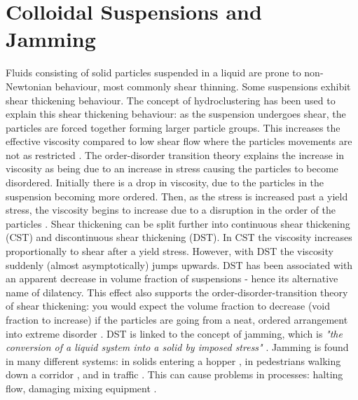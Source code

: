 \documentclass[twoside,a4]{report}
\def\br{\newline \newline \noindent}
\begin{document}
	\section*{Colloidal Suspensions and Jamming} %
	Fluids consisting of solid particles suspended in a liquid are prone to non-Newtonian behaviour, most commonly shear thinning. Some suspensions exhibit shear thickening behaviour. The concept of hydroclustering has been used to explain this shear thickening behaviour: as the suspension undergoes shear, the particles are forced together forming larger particle groups. This increases the effective viscosity compared to low shear flow where the particles movements are not as restricted \cite{figshearthick}. The order-disorder transition  theory explains the increase in viscosity as being due to an increase in stress causing the particles to become disordered. Initially there is a drop in viscosity, due to the particles in the suspension becoming more ordered. Then, as the stress is increased past a yield stress, the viscosity begins to increase due to a disruption in the order of the particles \cite[p.~7]{backbrownjaegrev}. %
	\br
	Shear thickening can be split further into continuous shear thickening (CST) and discontinuous shear thickening (DST). In CST the viscosity increases proportionally to shear after a yield stress. However, with DST the viscosity suddenly (almost asymptotically) jumps upwards. DST has been associated with an apparent decrease in volume fraction of suspensions - hence its alternative name of dilatency. This effect also supports the order-disorder-transition theory of shear thickening: you would expect the volume fraction to decrease (void fraction to increase) if the particles are going from a neat, ordered arrangement into extreme disorder \cite[p.~7]{backbrownjaegrev}. 
	\br
	DST is linked to the concept of jamming, which is \textit{"the conversion of a liquid system into a solid by imposed stress"} \cite{backhawjam}. Jamming is found in many different systems: in solids entering a hopper \cite{back2djam}, in pedestrians walking down a corridor \cite{backpedjam}, and in traffic \cite{backcarjam}. This can cause problems in processes: halting flow, damaging mixing equipment \cite{backshearjambertrand}. \br 
\end{document}
